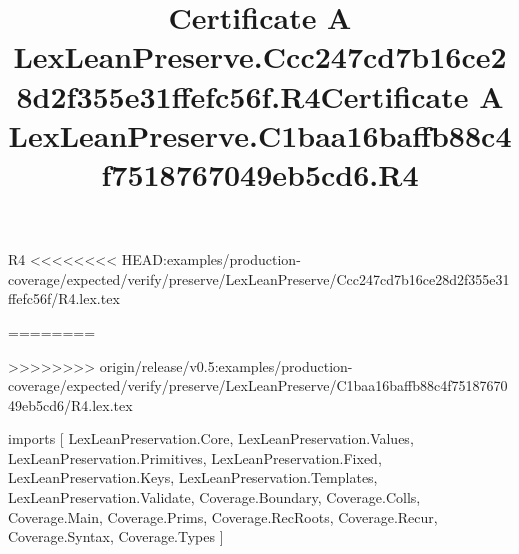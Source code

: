 \begin{lexlean}{R4}
<<<<<<<< HEAD:examples/production-coverage/expected/verify/preserve/LexLeanPreserve/Ccc247cd7b16ce28d2f355e31ffefc56f/R4.lex.tex
\title{Certificate A LexLeanPreserve.Ccc247cd7b16ce28d2f355e31ffefc56f.R4}
========
\title{Certificate A LexLeanPreserve.C1baa16baffb88c4f7518767049eb5cd6.R4}
>>>>>>>> origin/release/v0.5:examples/production-coverage/expected/verify/preserve/LexLeanPreserve/C1baa16baffb88c4f7518767049eb5cd6/R4.lex.tex
\begin{coremodule}
imports [
  LexLeanPreservation.Core,
  LexLeanPreservation.Values,
  LexLeanPreservation.Primitives,
  LexLeanPreservation.Fixed,
  LexLeanPreservation.Keys,
  LexLeanPreservation.Templates,
  LexLeanPreservation.Validate,
  Coverage.Boundary,
  Coverage.Colls,
  Coverage.Main,
  Coverage.Prims,
  Coverage.RecRoots,
  Coverage.Recur,
  Coverage.Syntax,
  Coverage.Types
]


\end{coremodule}
\end{lexlean}
